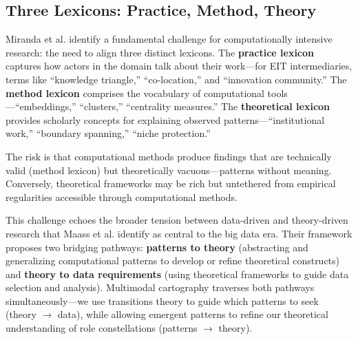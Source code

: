 \documentclass[../main.tex]{subfiles}
\begin{document}
\subsection{Three Lexicons: Practice, Method, Theory}

Miranda et al. \citeyear{miranda2022computationally} identify a fundamental challenge for computationally intensive research: the need to align three distinct lexicons. The \textbf{practice lexicon} captures how actors in the domain talk about their work---for EIT intermediaries, terms like ``knowledge triangle,'' ``co-location,'' and ``innovation community.'' The \textbf{method lexicon} comprises the vocabulary of computational tools---``embeddings,'' ``clusters,'' ``centrality measures.'' The \textbf{theoretical lexicon} provides scholarly concepts for explaining observed patterns---``institutional work,'' ``boundary spanning,'' ``niche protection.''

The risk is that computational methods produce findings that are technically valid (method lexicon) but theoretically vacuous---patterns without meaning. Conversely, theoretical frameworks may be rich but untethered from empirical regularities accessible through computational methods.

This challenge echoes the broader tension between data-driven and theory-driven research that Maass et al. \citeyear{maass2018data} identify as central to the big data era. Their framework proposes two bridging pathways: \textbf{patterns to theory} (abstracting and generalizing computational patterns to develop or refine theoretical constructs) and \textbf{theory to data requirements} (using theoretical frameworks to guide data selection and analysis). Multimodal cartography traverses both pathways simultaneously---we use transitions theory to guide which patterns to seek (theory $\rightarrow$ data), while allowing emergent patterns to refine our theoretical understanding of role constellations (patterns $\rightarrow$ theory).
\end{document}
